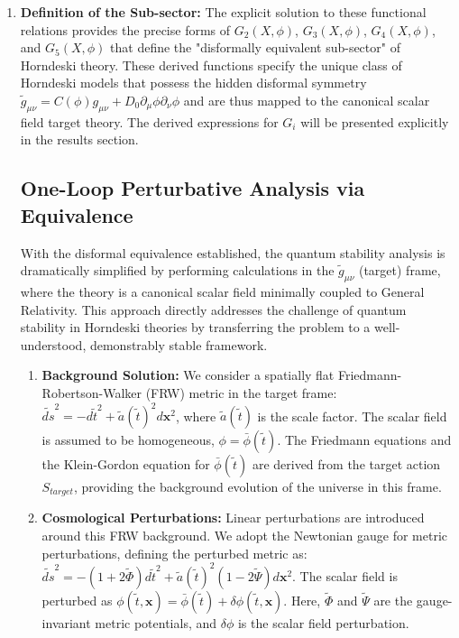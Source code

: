 \documentclass[twocolumn]{aastex631}
\begin{document}
\begin{enumerate}
    \item \textbf{Definition of the Sub-sector:} The explicit solution to these functional relations provides the precise forms of $G_2(X, \phi)$, $G_3(X, \phi)$, $G_4(X, \phi)$, and $G_5(X, \phi)$ that define the "disformally equivalent sub-sector" of Horndeski theory. These derived functions specify the unique class of Horndeski models that possess the hidden disformal symmetry $\tilde{g}_{\mu\nu} = C(\phi) g_{\mu\nu} + D_0 \partial_\mu\phi \partial_\nu\phi$ and are thus mapped to the canonical scalar field target theory. The derived expressions for $G_i$ will be presented explicitly in the results section.

\subsection{One-Loop Perturbative Analysis via Equivalence}
With the disformal equivalence established, the quantum stability analysis is dramatically simplified by performing calculations in the $\tilde{g}_{\mu\nu}$ (target) frame, where the theory is a canonical scalar field minimally coupled to General Relativity. This approach directly addresses the challenge of quantum stability in Horndeski theories by transferring the problem to a well-understood, demonstrably stable framework.

\begin{enumerate}
    \item \textbf{Background Solution:} We consider a spatially flat Friedmann-Robertson-Walker (FRW) metric in the target frame: $\tilde{ds}^2 = -d\tilde{t}^2 + \tilde{a}(\tilde{t})^2 d\mathbf{x}^2$, where $\tilde{a}(\tilde{t})$ is the scale factor. The scalar field is assumed to be homogeneous, $\phi = \bar{\phi}(\tilde{t})$. The Friedmann equations and the Klein-Gordon equation for $\bar{\phi}(\tilde{t})$ are derived from the target action $S_{target}$, providing the background evolution of the universe in this frame.

    \item \textbf{Cosmological Perturbations:} Linear perturbations are introduced around this FRW background. We adopt the Newtonian gauge for metric perturbations, defining the perturbed metric as:
    $\tilde{ds}^2 = -(1+2\tilde{\Phi})d\tilde{t}^2 + \tilde{a}(\tilde{t})^2(1-2\tilde{\Psi})d\mathbf{x}^2$.
    The scalar field is perturbed as $\phi(\tilde{t}, \mathbf{x}) = \bar{\phi}(\tilde{t}) + \delta\phi(\tilde{t}, \mathbf{x})$. Here, $\tilde{\Phi}$ and $\tilde{\Psi}$ are the gauge-invariant metric potentials, and $\delta\phi$ is the scalar field perturbation.


\end{enumerate}
\end{enumerate}
\end{document}
